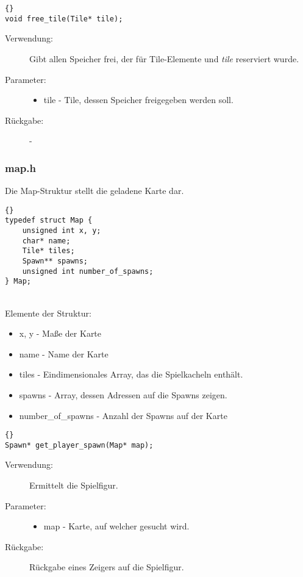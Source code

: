 \documentclass[11pt,a4paper,notitlepage]{report}
\begin{document}
		\begin{lstlisting}[caption=free\_tile]{}
void free_tile(Tile* tile);
		\end{lstlisting}
		
	\begin{description}
		\item[Verwendung:] Gibt allen Speicher frei, der für Tile-Elemente und \textit{tile} reserviert wurde.
		\item[Parameter:] \hfill
		\begin{itemize}
			\item tile - Tile, dessen Speicher freigegeben werden soll.
		\end{itemize}
		\item[Rückgabe:] -
	\end{description}
	
	\newpage
	\subsubsection*{map.h}
	Die Map-Struktur stellt die geladene Karte dar.
	
			\begin{lstlisting}[caption=Map]{}
typedef struct Map {
	unsigned int x, y;
	char* name;
	Tile* tiles;
	Spawn** spawns;
	unsigned int number_of_spawns;
} Map;
		\end{lstlisting} \hspace*{\fill} \\
Elemente der Struktur:
		\begin{itemize}
			\item x, y - Maße der Karte
			\item name - Name der Karte
			\item tiles - Eindimensionales Array, das die Spielkacheln enthält.
			\item spawns - Array, dessen Adressen auf die Spawns zeigen.
			\item number\_of\_spawns - Anzahl der Spawns auf der Karte
		\end{itemize}
		
		\begin{lstlisting}[caption=get\_player\_spawn]{}
Spawn* get_player_spawn(Map* map);
		\end{lstlisting}
		
	\begin{description}
		\item[Verwendung:] Ermittelt die Spielfigur.
		\item[Parameter:] \hfill
		\begin{itemize}
			\item map - Karte, auf welcher gesucht wird.
		\end{itemize}
		\item[Rückgabe:] Rückgabe eines Zeigers auf die Spielfigur.
	\end{description}
	
\end{document}
